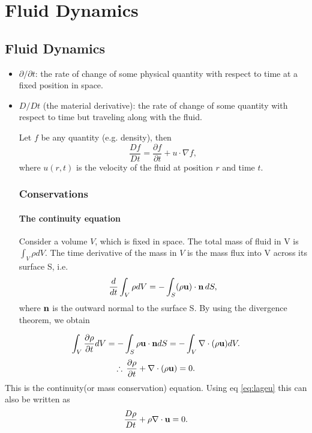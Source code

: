 \chapter{Fluid Dynamics}

\section{Fluid Dynamics}

\begin{itemize}
   \item $\partial / \partial t$: the rate of change of some physical quantity with respect to time at a 
fixed position in space.

   \item $D /Dt$ (the material derivative): the rate of change of some quantity with respect to time but
traveling along with the fluid. 

Let $f$ be any quantity (e.g. density), then
\begin{equation}\label{eq:lageu}
   \frac{Df}{Dt} = \frac{\partial f}{\partial t} + u \cdot \nabla f,
\end{equation}
where $u(r,t)$ is the velocity of the fluid at position $r$ and time $t$.

\bigskip
\subsection{Conservations}

\subsubsection{The continuity equation}
Consider a volume $V$, which is fixed in space. The total mass of fluid in V is $\int_{V} \rho d V$.
The time derivative of the mass in $V$ is the mass flux into V across its surface S, i.e.
\begin{equation}
   \frac{d}{dt}\int_{V} \rho dV = - \int_{S} (\rho {\bf u})\cdot {\bf n} \, dS,
\end{equation}
where ${\bf n}$ is the outward normal to the surface S. By using the divergence theorem, we obtain
\end{itemize}

\begin{equation}
   \int_{V} \frac{\partial \rho}{\partial t} d V = - \int_{S} \rho {\bf u} \cdot {\bf n} dS
   =-\int_{V} \nabla \cdot (\rho {\bf u}) dV.
\end{equation}
\begin{equation}\label{eq:continuity1}
  \therefore \, \frac{\partial \rho}{\partial t} + \nabla \cdot (\rho {\bf u}) = 0.
\end{equation}
This is the continuity(or mass conservation) equation. Using eq \ref{eq:lageu} this can also be 
written as 
\begin{equation}\label{eq:continuity2}
   \frac{D \rho}{D t} + \rho \nabla \cdot {\bf u}=0.
\end{equation}

